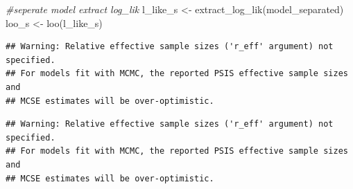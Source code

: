 \documentclass[
]{article}
\newenvironment{Shaded}{\begin{snugshade}}{\end{snugshade}}
\newcommand{\CommentTok}[1]{\textcolor[rgb]{0.56,0.35,0.01}{\textit{#1}}}
\newcommand{\DecValTok}[1]{\textcolor[rgb]{0.00,0.00,0.81}{#1}}
\newcommand{\FunctionTok}[1]{\textcolor[rgb]{0.00,0.00,0.00}{#1}}
\newcommand{\NormalTok}[1]{#1}
\newcommand{\OtherTok}[1]{\textcolor[rgb]{0.56,0.35,0.01}{#1}}
\newcommand{\SpecialCharTok}[1]{\textcolor[rgb]{0.00,0.00,0.00}{#1}}
\begin{document}
\begin{Shaded}
\begin{Highlighting}[]
\CommentTok{\#seperate model extract log\_lik}
\NormalTok{l\_like\_s }\OtherTok{\textless{}{-}} \FunctionTok{extract\_log\_lik}\NormalTok{(model\_separated)}
\NormalTok{loo\_s }\OtherTok{\textless{}{-}} \FunctionTok{loo}\NormalTok{(l\_like\_s)}
\end{Highlighting}
\end{Shaded}

\begin{verbatim}
## Warning: Relative effective sample sizes ('r_eff' argument) not specified.
## For models fit with MCMC, the reported PSIS effective sample sizes and 
## MCSE estimates will be over-optimistic.
\end{verbatim}

\begin{Shaded}
\end{Shaded}

\begin{verbatim}
## Warning: Relative effective sample sizes ('r_eff' argument) not specified.
## For models fit with MCMC, the reported PSIS effective sample sizes and 
## MCSE estimates will be over-optimistic.
\end{verbatim}

\begin{Shaded}
\end{Shaded}
\end{document}
